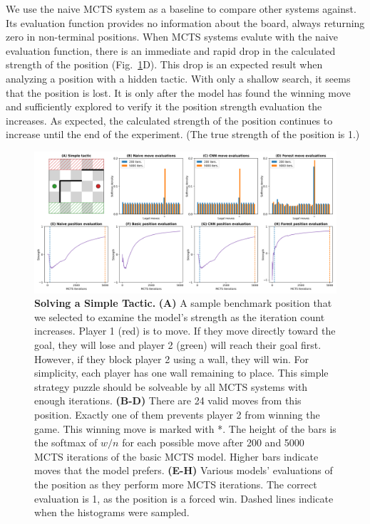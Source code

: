 \documentclass[10pt]{article}
\begin{document}
We use the naive MCTS system as a baseline to compare other systems against. Its evaluation function provides no information about the board, always returning zero in non-terminal positions. When MCTS systems evalute with the naive evaluation function, there is an immediate and rapid drop in the calculated strength of the position (Fig.~\ref{fig:MCTS}D). This drop is an expected result when analyzing a position with a hidden tactic. With only a shallow search, it seems that the position is lost. It is only after the model has found the winning move and sufficiently explored to verify it the position strength evaluation the increases. As expected, the calculated strength of the position continues to increase until the end of the experiment. (The true strength of the position is 1.)



\begin{figure}[H]
    \centering
    \includegraphics[width=\linewidth]{MCTS_eval.png}
    \caption{\textbf{Solving a Simple Tactic.} \textbf{(A)} A sample benchmark position that we selected to examine the model's strength as the iteration count increases. Player 1 (red) is to move. If they move directly toward the goal, they will lose and player 2 (green) will reach their goal first. However, if they block player 2 using a wall, they will win. For simplicity, each player has one wall remaining to place. This simple strategy puzzle should be solveable by all MCTS systems with enough iterations. \textbf{(B-D)} There are 24 valid moves from this position. Exactly one of them prevents player 2 from winning the game. This winning move is marked with *. The height of the bars is the softmax of $w/n$ for each possible move after 200 and 5000 MCTS iterations of the basic MCTS model. Higher bars indicate moves that the model prefers. \textbf{(E-H)} Various models' evaluations of the position as they perform more MCTS iterations. The correct evaluation is 1, as the position is  a forced win. Dashed lines indicate when the histograms were sampled.}
    \label{fig:MCTS}
\end{figure}
\end{document}
